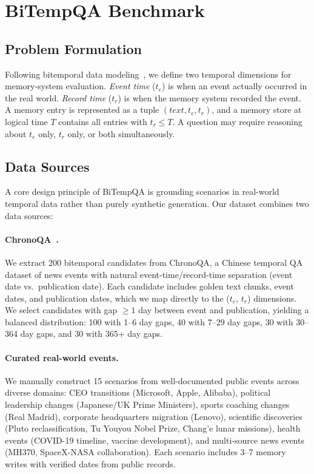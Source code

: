 \section{BiTempQA Benchmark}

\subsection{Problem Formulation}
Following bitemporal data modeling~\citep{snodgrass1999tsql2}, we define two temporal dimensions for memory-system evaluation.
\textit{Event time} ($t_e$) is when an event actually occurred in the real world.
\textit{Record time} ($t_r$) is when the memory system recorded the event.
A memory entry is represented as a tuple $(\textit{text}, t_e, t_r)$, and a memory store at logical time $T$ contains all entries with $t_r \leq T$. A question may require reasoning about $t_e$ only, $t_r$ only, or both simultaneously.

\subsection{Data Sources}
A core design principle of BiTempQA is grounding scenarios in real-world temporal data rather than purely synthetic generation. Our dataset combines two data sources:

\paragraph{ChronoQA~\citep{chronoqa2025}.}
We extract 200 bitemporal candidates from ChronoQA, a Chinese temporal QA dataset of news events with natural event-time/record-time separation (event date vs.\ publication date).
Each candidate includes golden text chunks, event dates, and publication dates, which we map directly to the ($t_e$, $t_r$) dimensions.
We select candidates with gap $\geq 1$ day between event and publication, yielding a balanced distribution: 100 with 1--6 day gaps, 40 with 7--29 day gaps, 30 with 30--364 day gaps, and 30 with 365+ day gaps.

\paragraph{Curated real-world events.}
We manually construct 15 scenarios from well-documented public events across diverse domains: CEO transitions (Microsoft, Apple, Alibaba), political leadership changes (Japanese/UK Prime Ministers), sports coaching changes (Real Madrid), corporate headquarters migration (Lenovo), scientific discoveries (Pluto reclassification, Tu Youyou Nobel Prize, Chang'e lunar missions), health events (COVID-19 timeline, vaccine development), and multi-source news events (MH370, SpaceX-NASA collaboration).
Each scenario includes 3--7 memory writes with verified dates from public records.

